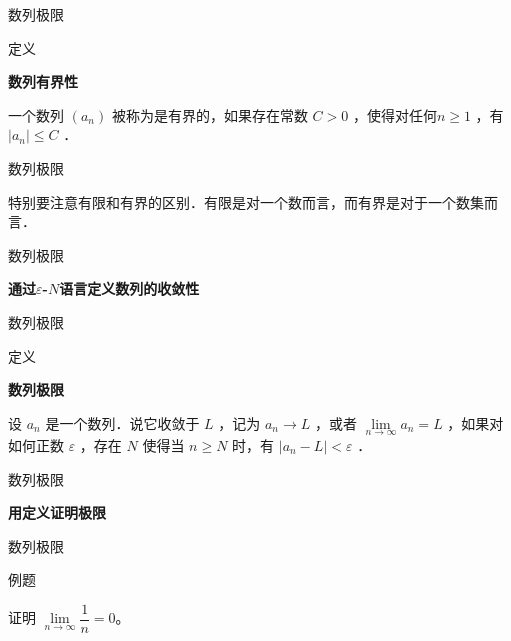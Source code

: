 \documentclass[aspectratio=169,10pt,fontset=fandol]{ctexbeamer}
\begin{document}
\begin{frame}[t,fragile]{数列极限}
\footnotesize
\begin{block}{定义}
{\footnotesize
\textbf{数列有界性}\par

	 一个数列 $\left(a_n\right)$ 被称为是有界的，如果存在常数 $C>0$ ，使得对任何$n \geqslant 1$ ，有 $\left|a_n\right| \leqslant C$ ．

}
\end{block}
\end{frame}
\begin{frame}[t,fragile]{数列极限}
\footnotesize
{\footnotesize
特别要注意有限和有界的区别．有限是对一个数而言，而有界是对于一个数集而言．


}
\end{frame}
\begin{frame}[t,fragile]{数列极限}
\footnotesize
{\footnotesize

\textbf{通过\texorpdfstring{\(\varepsilon\)-\(N\)语言定义数列的收敛性}{epsilon-N 定义}}


}
\end{frame}
\begin{frame}[t,fragile]{数列极限}
\footnotesize
\begin{block}{定义}
{\footnotesize
\textbf{数列极限}\par

设 $a_n$ 是一个数列．说它收敛于 $L$ ，记为 $a_n \rightarrow L$ ，或者 $\lim \limits_{n \to \infty} a_n=L$ ，如果对如何正数 $\varepsilon$ ，存在 $N$ 使得当 $n \geqslant N$ 时，有 $\left|a_n-L\right|<\varepsilon$ ．

}
\end{block}
\end{frame}
\begin{frame}[t,fragile]{数列极限}
\footnotesize
{\footnotesize
\textbf{用定义证明极限}


}
\end{frame}
\begin{frame}[t,fragile]{数列极限}
\footnotesize
\begin{block}{例题}
{\footnotesize
证明 \(\lim\limits_{n\to\infty} \dfrac{1}{n} = 0\)。

}
\end{block}
\end{frame}
\end{document}
